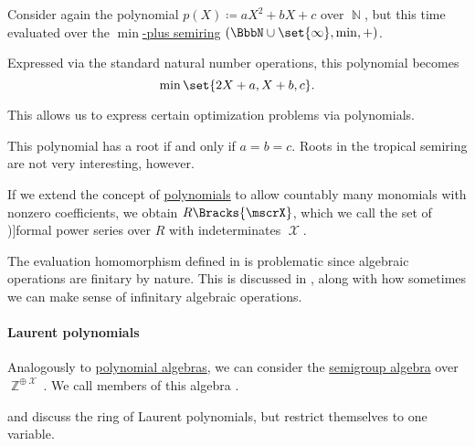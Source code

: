 \begin{example}
\begin{thmenum}
     Consider again the polynomial \( p(X) \coloneqq aX^2 + bX + c \) over \( \BbbN \), but this time evaluated over the \hyperref[def:tropical_semiring]{\( \min \)-plus semiring} \( (\BbbN \cup \set{ \infty }, \min, +) \).

    Expressed via the standard natural number operations, this polynomial becomes
    \begin{equation*}
      \min\set{ 2X + a, X + b, c }.
    \end{equation*}

    This allows us to express certain optimization problems via polynomials.

    This polynomial has a root if and only if \( a = b = c \). Roots in the tropical semiring are not very interesting, however.
  \end{thmenum}
\end{example}

\begin{definition}\label{def:formal_power_series}
  If we extend the concept of \hyperref[def:polynomial_algebra]{polynomials} to allow countably many monomials with nonzero coefficients, we obtain \( R\Bracks{\mscrX} \), which we call the set of \term[ru=формальные степянные ряды (\cite[28]{Шафаревич1999})]{formal power series} over \( R \) with indeterminates \( \mscrX \).
\end{definition}
\begin{comments}
  \item The evaluation homomorphism defined in  is problematic since algebraic operations are finitary by nature. This is discussed in , along with how sometimes we can make sense of infinitary algebraic operations.
\end{comments}

\paragraph{Laurent polynomials}

\begin{definition}\label{def:laurent_polynomial_algebra}\mimprovised
  Analogously to \hyperref[def:polynomial_algebra]{polynomial algebras}, we can consider the \hyperref[def:semigroup_algebra]{semigroup algebra} over \( \BbbZ^{\oplus \mscrX} \). We call members of this algebra .
\end{definition}
\begin{comments}
  \item {} and  discuss the ring of Laurent polynomials, but restrict themselves to one variable.
\end{comments}

